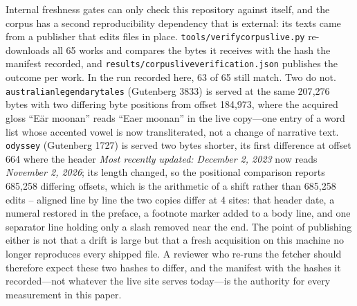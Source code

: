 \documentclass[11pt]{article}
\DeclareRobustCommand{\_}{\textunderscore\allowbreak}
\begin{document}
Internal freshness gates can only check this repository against itself, and the corpus has a
second reproducibility dependency that is external: its texts came from a publisher that edits
files in place. \texttt{tools/verify\_corpus\_live.py} re-downloads all 65 works and compares the
bytes it receives with the hash the manifest recorded, and
\texttt{results/corpus\_live\_verification.json} publishes the outcome per work. In the run
recorded here, 63 of 65 still match. Two do not. \texttt{australian\_legendary\_tales}
(Gutenberg 3833) is served at the same 207{,}276 bytes with two differing byte positions from
offset 184{,}973, where the acquired gloss ``E\"{a}r moonan'' reads ``Eaer moonan'' in the live
copy---one entry of a word list whose accented vowel is now transliterated, not a change of
narrative text. \texttt{odyssey} (Gutenberg 1727) is served two bytes shorter, its first
difference at offset 664 where the header \emph{Most recently updated: December 2, 2023} now
reads \emph{November 2, 2026}; its length changed, so the positional comparison reports
685{,}258 differing offsets, which is the arithmetic of a shift rather than 685{,}258 edits --
aligned line by line the two copies differ at 4 sites: that header date, a numeral restored
in the preface, a footnote marker added to a body line, and one separator line holding only a slash removed near the end. The point of publishing
either is not that a drift is large but that a fresh
acquisition on this machine no longer reproduces every shipped file. A reviewer who re-runs the
fetcher should therefore expect these two hashes to differ, and the manifest with the hashes it
recorded---not whatever the live site serves today---is the authority for every measurement in
this paper.
\end{document}
